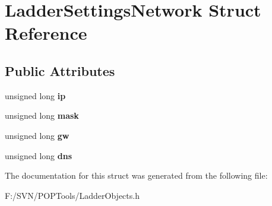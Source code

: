 \hypertarget{struct_ladder_settings_network}{\section{Ladder\-Settings\-Network Struct Reference}
\label{struct_ladder_settings_network}
}
\subsection*{Public Attributes}
\begin{DoxyCompactItemize}
\item 
\hypertarget{struct_ladder_settings_network_a3b570068da6889a3dc882fdc54620e52}{unsigned long {\bfseries ip}}\label{struct_ladder_settings_network_a3b570068da6889a3dc882fdc54620e52}

\item 
\hypertarget{struct_ladder_settings_network_ab61d72c19a7717ee6038a6dbe6771759}{unsigned long {\bfseries mask}}\label{struct_ladder_settings_network_ab61d72c19a7717ee6038a6dbe6771759}

\item 
\hypertarget{struct_ladder_settings_network_ac49c8829da8411f73516bb49b6cc3761}{unsigned long {\bfseries gw}}\label{struct_ladder_settings_network_ac49c8829da8411f73516bb49b6cc3761}

\item 
\hypertarget{struct_ladder_settings_network_aa82050906150014625a4057943f4163e}{unsigned long {\bfseries dns}}\label{struct_ladder_settings_network_aa82050906150014625a4057943f4163e}

\end{DoxyCompactItemize}


The documentation for this struct was generated from the following file\-:\begin{DoxyCompactItemize}
\item 
F\-:/\-S\-V\-N/\-P\-O\-P\-Tools/Ladder\-Objects.\-h\end{DoxyCompactItemize}
